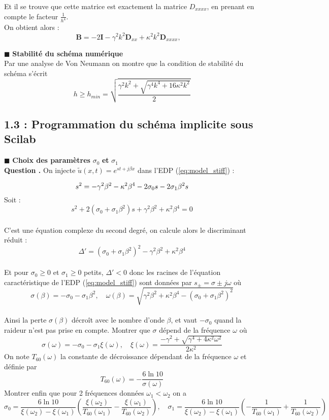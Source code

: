 \documentclass[a4,12pt]{article}
\newcommand{\B}{\mathbf{B}}
\newcommand{\D}{\mathbf{D}}
\newcounter{Nbquestion}
\newcommand*\question{%
\stepcounter{Nbquestion}%
\textbf{Question \theNbquestion. }}
\begin{document}
    Et il se trouve que cette matrice est exactement la matrice $D_{xxxx}$, en prenant en compte le facteur $\frac{1}{h^4}$.\\

  On obtient alors :
  $$ \B=-2\mathbf{I}-\gamma^2 k^2 \D_{xx}+\kappa^2 k^2\D_{xxxx}, \quad $$


  \hspace{0.5cm} $\blacksquare$ \textbf{Stabilité du schéma numérique} \\

  Par une analyse de Von Neumann on montre que la condition de stabilité du schéma s'écrit 
  \[
    h\geqslant h_{min}=\sqrt{\frac{\gamma^2k^2+\sqrt{\gamma^4 k^4+16\kappa^2 k^2}}{2}}
  \]

  \subsection*{1.3 : Programmation du schéma implicite sous Scilab}

  \hspace{0.5cm} $\blacksquare$ \textbf{Choix des paramètres} $\sigma_0$  \textbf{et}  $\sigma_1$\\


  \question On injecte $\tilde u(x,t)=e^{st+j\beta x}$ dans l'EDP (\ref{eq:model_stiff}) :

  \[
s^2 = -\gamma^2 \beta^2 - \kappa^2 \beta^4 - 2 \sigma_0 s - 2 \sigma_1 \beta^2 s\\
  \]
  Soit :
  \[
s^2 + 2(\sigma_0 + \sigma_1 \beta^2) s + \gamma^2 \beta^2 + \kappa^2 \beta^4 = 0
  \]~\\
  C'est une équation complexe du second degré, on calcule alors le discriminant réduit :
  \[
\Delta' = (\sigma_0 + \sigma_1 \beta^2)^2 - \gamma^2 \beta^2 + \kappa^2 \beta^4
  \]~\\
  Et pour $\sigma_0\geqslant 0$ et $\sigma_1\geqslant 0$ petits, $\Delta' < 0$ donc les racines de l'équation caractéristique de l'EDP (\ref{eq:model_stiff}) sont données par $s_{\pm}=\sigma\pm j\omega$ où 
  \[
    \sigma(\beta)=-\sigma_0-\sigma_1\beta^2,\quad \omega(\beta)=\sqrt{\gamma^2 \beta^2+\kappa^2\beta^4-(\sigma_0+\sigma_1\beta^2)^2}
  \]~\\

  Ainsi la perte $\sigma(\beta)$ décroît avec le nombre d'onde $\beta$, et vaut $-\sigma_0$ quand la raideur n'est pas prise en compte.  Montrer que $\sigma$ dépend de la fréquence $\omega$ où 
  \[
    \sigma(\omega)=-\sigma_0-\sigma_1\xi (\omega),\quad \xi(\omega)=\frac{-\gamma^2+\sqrt{\gamma^4+4\kappa^2 \omega^2}}{2\kappa^2}
  \]
  On note $T_{60}(\omega)$ la constante de décroissance dépendant de la fréquence $\omega$ et définie par 
  \[
    T_{60}(\omega)=-\frac{6\ln 10}{\sigma(\omega)}
  \]
  Montrer enfin que pour 2 fréquences données $\omega_1<\omega_2$ on a 
  \[
    \sigma_0=\frac{6 \ln 10}{\xi(\omega_2)-\xi(\omega_1)}\left(\frac{\xi(\omega_2)}{T_{60}(\omega_1)}-\frac{\xi(\omega_1)}{T_{60}(\omega_2)}\right), \quad \sigma_1=\frac{6 \ln 10}{\xi(\omega_2)-\xi(\omega_1)}\left(-\frac{1}{T_{60}(\omega_1)}+\frac{1}{T_{60}(\omega_2)}\right)
  \]
\end{document}
